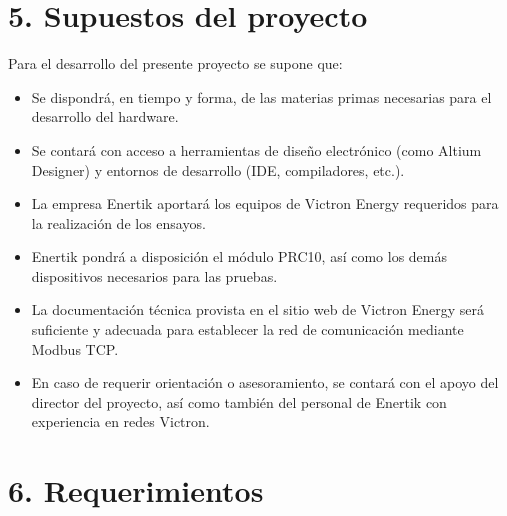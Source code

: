 \documentclass[
11pt, %
]{charter}
\begin{document}
\section{5. Supuestos del proyecto}
\label{sec:supuestos}

Para el desarrollo del presente proyecto se supone que: 

\begin{itemize}
	\item Se dispondrá, en tiempo y forma, de las materias primas necesarias para el desarrollo del hardware.
	\item Se contará con acceso a herramientas de diseño electrónico (como Altium Designer) y entornos de desarrollo (IDE, compiladores, etc.).
	\item La empresa Enertik aportará los equipos de Victron Energy requeridos para la realización de los ensayos.
	\item Enertik pondrá a disposición el módulo PRC10, así como los demás dispositivos necesarios para las pruebas.
	\item La documentación técnica provista en el sitio web de Victron Energy será suficiente y adecuada para establecer la red de comunicación mediante Modbus TCP.
	\item En caso de requerir orientación o asesoramiento, se contará con el apoyo del director del proyecto, así como también del personal de Enertik con experiencia en redes Victron.
	
\end{itemize}

\section{6. Requerimientos}
\label{sec:requerimientos}
\end{document}
